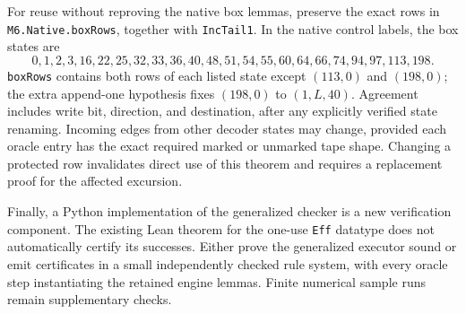For reuse without reproving the native box lemmas, preserve the exact
rows in \texttt{M6.Native.boxRows}, together with
\texttt{IncTail1}.  In the native control labels, the box states are
\[
0,1,2,3,16,22,25,32,33,36,40,48,51,54,55,60,64,66,74,94,97,113,198.
\]
\texttt{boxRows} contains both rows of each listed state except
$(113,0)$ and $(198,0)$; the extra append-one hypothesis fixes
$(198,0)$ to $(1,L,40)$.  Agreement includes write bit, direction,
and destination, after any explicitly verified state renaming.
Incoming edges from other decoder states may change, provided each
oracle entry has the exact required marked or unmarked tape shape.
Changing a protected row invalidates direct use of this theorem and
requires a replacement proof for the affected excursion.

Finally, a Python implementation of the generalized checker is a new
verification component.  The existing Lean theorem for the one-use
\texttt{Eff} datatype does not automatically certify its successes.
Either prove the generalized executor sound or emit certificates in a
small independently checked rule system, with every oracle step
instantiating the retained engine lemmas.  Finite numerical sample
runs remain supplementary checks.
